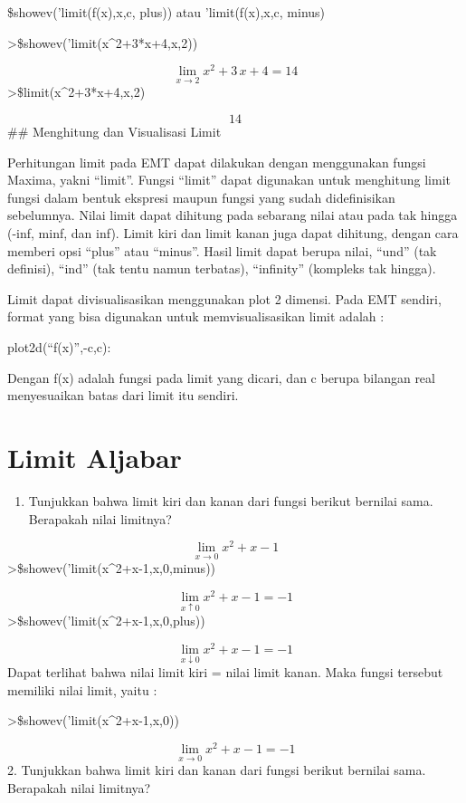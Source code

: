 \documentclass[
]{book}
\providecommand{\tightlist}{%
  \setlength{\itemsep}{0pt}\setlength{\parskip}{0pt}}
\begin{document}
\$showev('limit(f(x),x,c, plus)) atau 'limit(f(x),x,c, minus)

\textgreater\$showev('limit(x\^{}2+3*x+4,x,2))

\[\lim_{x\rightarrow 2}{x^2+3\,x+4}=14\]\textgreater\$limit(x\^{}2+3*x+4,x,2)

\[14\]\#\# Menghitung dan Visualisasi Limit

Perhitungan limit pada EMT dapat dilakukan dengan menggunakan fungsi Maxima, yakni ``limit''. Fungsi ``limit'' dapat digunakan untuk menghitung limit fungsi dalam bentuk ekspresi maupun fungsi yang sudah didefinisikan sebelumnya. Nilai limit dapat dihitung pada sebarang nilai atau pada tak hingga (-inf, minf, dan inf). Limit kiri dan limit kanan juga dapat dihitung, dengan cara memberi opsi ``plus'' atau ``minus''. Hasil limit dapat berupa nilai, ``und'' (tak definisi), ``ind'' (tak tentu namun terbatas), ``infinity'' (kompleks tak hingga).

Limit dapat divisualisasikan menggunakan plot 2 dimensi. Pada EMT sendiri, format yang bisa digunakan untuk memvisualisasikan limit adalah :

plot2d(``f(x)'',-c,c):

Dengan f(x) adalah fungsi pada limit yang dicari, dan c berupa bilangan real menyesuaikan batas dari limit itu sendiri.

\section{Limit Aljabar}\label{limit-aljabar}

\begin{enumerate}
\def\labelenumi{\arabic{enumi}.}
\tightlist
\item
  Tunjukkan bahwa limit kiri dan kanan dari fungsi berikut bernilai sama. Berapakah nilai limitnya?
\end{enumerate}

\[\lim_{x\rightarrow 0}{x^2+x-1}\]\textgreater\$showev('limit(x\^{}2+x-1,x,0,minus))

\[\lim_{x\uparrow 0}{x^2+x-1}=-1\]\textgreater\$showev('limit(x\^{}2+x-1,x,0,plus))

\[\lim_{x\downarrow 0}{x^2+x-1}=-1\]Dapat terlihat bahwa nilai limit kiri = nilai limit kanan. Maka fungsi tersebut memiliki nilai limit, yaitu :

\textgreater\$showev('limit(x\^{}2+x-1,x,0))

\[\lim_{x\rightarrow 0}{x^2+x-1}=-1\]2. Tunjukkan bahwa limit kiri dan kanan dari fungsi berikut bernilai sama. Berapakah nilai limitnya?
\end{document}
